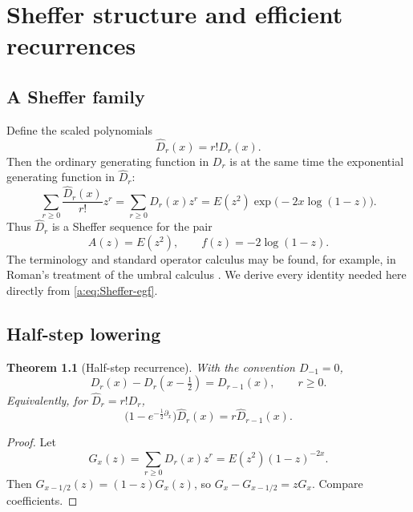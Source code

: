\documentclass[11pt,a4paper,oneside,openany]{book}
\numberwithin{equation}{chapter}
\newtheorem{theorem}{Theorem}[chapter]
\theoremstyle{definition}
\theoremstyle{remark}
\newcommand{\Diag}{D}
\begin{document}
\chapter{Sheffer structure and efficient recurrences}\label{ch:sheffer}

\section{A Sheffer family}

Define the scaled polynomials
\begin{equation}
 \widehat\Diag_r(x)=r!\Diag_r(x).
 \label{a:eq:p-def}
\end{equation}
Then the ordinary generating function in \(\Diag_r\) is at the same time the
exponential generating function in \(\widehat\Diag_r\):
\begin{equation}
 \sum_{r\ge0}\frac{\widehat\Diag_r(x)}{r!}z^r
 =\sum_{r\ge0}\Diag_r(x)z^r
 =E(z^2)\exp\!\bigl(-2x\log(1-z)\bigr).
 \label{a:eq:Sheffer-egf}
\end{equation}
Thus \(\widehat\Diag_r\) is a Sheffer sequence for the pair
\begin{equation}
 A(z)=E(z^2),
 \qquad
 f(z)=-2\log(1-z).
 \label{a:eq:Sheffer-pair}
\end{equation}
The terminology and standard operator calculus may be found, for example, in
Roman's treatment of the umbral calculus \cite{roman}.  We derive every
identity needed here directly from \eqref{a:eq:Sheffer-egf}.

\section{Half-step lowering}

\begin{theorem}[Half-step recurrence]
With the convention \(\Diag_{-1}=0\),
\begin{equation}
 \boxed{
 \Diag_r(x)-\Diag_r(x-\tfrac12)=\Diag_{r-1}(x),
 \qquad r\ge0.}
 \label{a:eq:half-step}
\end{equation}
Equivalently, for \(\widehat\Diag_r=r!\Diag_r\),
\begin{equation}
 \bigl(1-e^{-\frac12\partial_x}\bigr)\widehat\Diag_r(x)
 =r \widehat\Diag_{r-1}(x).
 \label{a:eq:delta-operator}
\end{equation}
\end{theorem}

\begin{proof}
Let
\[
 G_x(z)=\sum_{r\ge0}\Diag_r(x)z^r
 =E(z^2)(1-z)^{-2x}.
\]
Then \(G_{x-1/2}(z)=(1-z)G_x(z)\), so
\(G_x-G_{x-1/2}=zG_x\).  Compare coefficients.
\end{proof}
\end{document}

